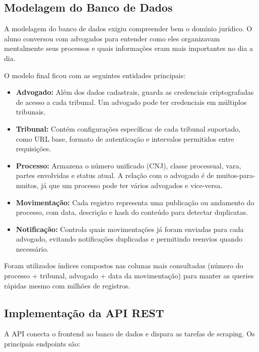 \documentclass[
	12pt,
	oneside,
	a4paper,
	brazil,
	sumario=tradicional
]{abntex2}
\begin{document}
\subsection{Modelagem do Banco de Dados}

A modelagem do banco de dados exigiu compreender bem o domínio jurídico. O aluno conversou com advogados para entender como eles organizavam mentalmente seus processos e quais informações eram mais importantes no dia a dia.

O modelo final ficou com as seguintes entidades principais:

\begin{itemize}
    \item \textbf{Advogado:} Além dos dados cadastrais, guarda as credenciais criptografadas de acesso a cada tribunal. Um advogado pode ter credenciais em múltiplos tribunais.

    \item \textbf{Tribunal:} Contém configurações específicas de cada tribunal suportado, como URL base, formato de autenticação e intervalos permitidos entre requisições.

    \item \textbf{Processo:} Armazena o número unificado (CNJ), classe processual, vara, partes envolvidas e status atual. A relação com o advogado é de muitos-para-muitos, já que um processo pode ter vários advogados e vice-versa.

    \item \textbf{Movimentação:} Cada registro representa uma publicação ou andamento do processo, com data, descrição e hash do conteúdo para detectar duplicatas.

    \item \textbf{Notificação:} Controla quais movimentações já foram enviadas para cada advogado, evitando notificações duplicadas e permitindo reenvios quando necessário.
\end{itemize}

Foram utilizados índices compostos nas colunas mais consultadas (número do processo + tribunal, advogado + data da movimentação) para manter as queries rápidas mesmo com milhões de registros.

\subsection{Implementação da API REST}

A API conecta o frontend ao banco de dados e dispara as tarefas de scraping. Os principais endpoints são:
\end{document}
